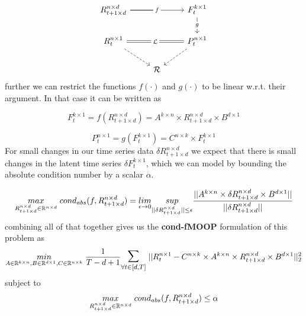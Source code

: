 \begin{equation} \label{pts_diagram}
\begin{tikzcd}
R^{n\times d}_{t+1 \times d} \arrow[rr, "f" description] \arrow[r, no head]& {}& F^{k\times 1}_{t} \arrow[d, "g" description] \\
R^{n\times 1}_t \arrow[rr, "\mathcal{L}" description, Rightarrow, no head] \arrow[rd, dashed] && P^{n \times 1}_{t} \arrow[ld, dashed]\\
& \mathcal{R} &
\end{tikzcd}
\end{equation}\newline 
further we can restrict the functions $f(\cdot)$ and $g(\cdot)$ to be linear w.r.t. their argument. In that case it can be written as

\begin{equation} \label{f_for_pts}
F^{k\times 1}_t = f(R^{n\times d}_{t+1\times d}) = A^{k\times n}\times R^{n\times d}_{t+1\times d}\times B^{d\times 1}
\end{equation}

\begin{equation} \label{g_for_pts}
P^{n \times 1}_{t} = g(F^{k\times 1}_t) = C^{n \times k} \times F^{k\times 1}_t
\end{equation}
\newline
For small changes in our time series data $\delta R^{n\times d}_{t+1\times d}$ we expect that there is small changes in the latent time series $\delta F^{k\times 1}_t$, which we can model by bounding the absolute condition number by a scalar $\alpha$.

\begin{equation}
    \underset{R^{n\times d}_{t+1\times d} \in \mathbb{R}^{n\times d}}{max}\hspace{1mm} cond_{abs}(f,R^{n\times d}_{t+1\times d}) = \underset{\epsilon \to 0}{lim}\underset{||\delta R^{n\times d}_{t+1\times d}||\le \epsilon}{sup} \frac{||A^{k\times n}\times \delta R^{n\times d}_{t+1\times d}\times B^{d\times 1}||}{||\delta R^{n\times d}_{t+1\times d}||}
\end{equation}\newline
combining all of that together gives us the \textbf{cond-fMOOP} formulation of this problem as
\begin{equation} \label{pts_loss}
\underset{A\in \mathbb{R}^{k\times n}, B \in \mathbb{R}^{d\times 1}, C \in \mathbb{R}^{n\times k}}{min}\hspace{1mm} \frac{1}{T-d+1} \mathlarger{\mathlarger{\sum}}_{\forall t\in [d,T]} \hspace{1mm} ||R^{n\times 1}_t-C^{n \times k} \times A^{k\times n}\times R^{n\times d}_{t+1\times d}\times B^{d\times 1}||_2^2
\end{equation}\newline
subject to
\begin{equation} \label{lfm_cond}
\underset{R^{n\times d}_{t+1\times d} \in \mathbb{R}^{n\times d}}{max}\hspace{1mm} cond_{abs}(f,R^{n\times d}_{t+1\times d}) \le \alpha
\end{equation}
\newline

